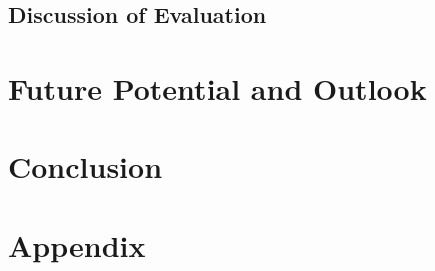 \documentclass[12pt, a4paper]{article}
\begin{document}
    \subsection{Discussion of Evaluation}

\section{Future Potential and Outlook}\label{sec::outlook}
\section{Conclusion}\label{sec::conclusion}



\newpage
\renewcommand{\thesubsection}{\Alph{subsection}}
\setcounter{page}{\value{lastroman}}
\section*{Appendix}


\newpage



\newpage
\listoffigures
\listoftables
\lstlistoflistings{}
\newpage

% 




\end{document}

